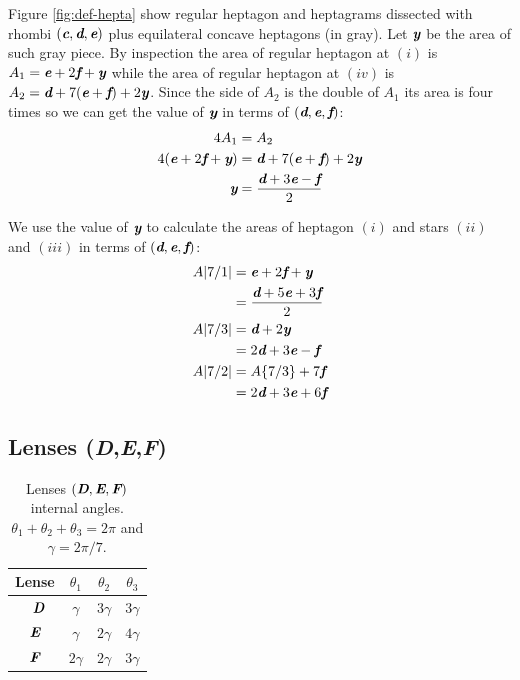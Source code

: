 \documentclass[11pt]{article}
\def\mathbi#1{\textbf{\em #1}}
\begin{document}
Figure \ref{fig:def-hepta} show regular heptagon and heptagrams dissected with rhombi $(\mathbi{c},\mathbi{d},\mathbi{e})$ plus equilateral concave heptagons (in gray). Let $\mathbi{y}$ be the area of such gray piece. By inspection the area of regular heptagon at $(i)$ is $A_1 = \mathbi{e} + 2\mathbi{f} + \mathbi{y}$ while the area of regular heptagon at $(iv)$ is $A_2 = \mathbi{d} + 7(\mathbi{e}+\mathbi{f}) + 2\mathbi{y}$. Since the side of $A_2$ is the double of $A_1$ its area is four times so we can get the value of $\mathbi{y}$ in terms of $(\mathbi{d},\mathbi{e},\mathbi{f})$:
\begin{align}
4A_1 &= A_2 \nonumber\\
4(\mathbi{e} + 2\mathbi{f} + \mathbi{y}) &= \mathbi{d} + 7(\mathbi{e}+\mathbi{f}) + 2\mathbi{y} \nonumber\\
\mathbi{y} &= \frac{\mathbi{d} + 3\mathbi{e} - \mathbi{f}}2
\end{align}

We use the value of $\mathbi{y}$ to calculate the areas of heptagon $(i)$ and stars $(ii)$ and $(iii)$ in terms of $(\mathbi{d},\mathbi{e},\mathbi{f})$:
\begin{align}
A|7/1| &= \mathbi{e} + 2\mathbi{f} + \mathbi{y} \nonumber\\
    &= \frac{\mathbi{d} + 5\mathbi{e} + 3\mathbi{f}}2 \\
A|7/3| &= \mathbi{d} + 2\mathbi{y} \nonumber\\
 &= 2\mathbi{d} + 3\mathbi{e} - \mathbi{f} \\
A|7/2| &= A\{7/3\} + 7\mathbi{f} \nonumber\\
 &= 2\mathbi{d} + 3\mathbi{e} + 6\mathbi{f}
\end{align}

\subsection{Lenses (\mathbi{D},\mathbi{E},\mathbi{F})}

\begin{table}[H]
\begin{center}
\begin{tabular}{|c|c c c|} \hline
Lense & $\theta_1$ & $\theta_2$ & $\theta_3$ \\ \hline\
$\mathbi{D}$ & $\gamma$ & $3\gamma$ & $3\gamma$ \\[0.5ex] \hline
$\mathbi{E}$ & $\gamma$ & $2\gamma$ & $4\gamma$ \\[0.5ex] \hline
$\mathbi{F}$ & $2\gamma$ & $2\gamma$ & $3\gamma$ \\[0.5ex] \hline
\end{tabular}
\caption{Lenses $(\mathbi{D},\mathbi{E},\mathbi{F})$ internal angles. $\theta_1+\theta_2+\theta_3 = 2\pi$ and $\gamma = 2\pi/7$.} 
\label{tbl:def-lenses-angles}
\end{center}
\end{table}
\end{document}
